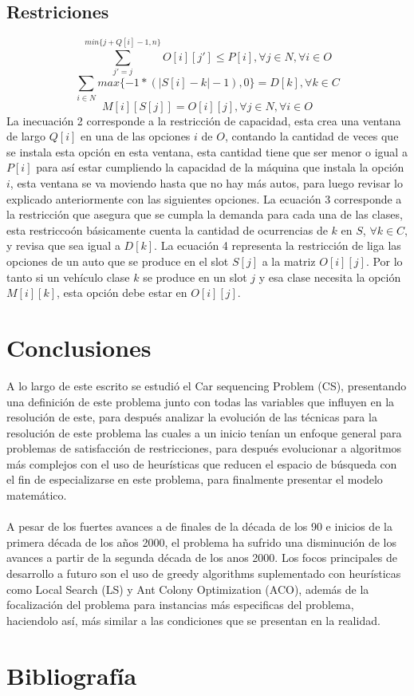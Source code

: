 \documentclass[letter, 10pt]{article}
\begin{document}
\subsection{Restriciones}
\begin{equation}
     \sum_{j'=j}^{min\{j+Q[i]-1,n\}} O[i][j'] \leq P[i],\forall j \in N,\forall i \in O
\end{equation}
\begin{equation}
     \sum_{i \in N} max\{-1*(|S[i] - k| - 1), 0\} = D[k],\forall k \in C
\end{equation}
\begin{equation}
    M[i][S[j]] = O[i][j], \forall j \in N, \forall i \in O
\end{equation}\newline
La inecuaci\'on 2 corresponde a la restricci\'on de capacidad, esta crea una ventana de largo $Q[i]$ en una de las opciones $i$ de $O   $, contando la cantidad de veces que se instala esta opci\'on en esta ventana, esta cantidad tiene que ser menor o igual a $P[i]$ para as\'i estar cumpliendo la capacidad de la m\'aquina que instala la opci\'on $i$, esta ventana se va moviendo hasta que no hay m\'as autos, para luego revisar lo explicado anteriormente con las siguientes opciones. La ecuaci\'on 3 corresponde a la restricci\'on que asegura que se cumpla la demanda para cada una de las clases, esta restricco\'on b\'asicamente cuenta la cantidad de ocurrencias de $k$ en $S$, $\forall k \in C$, y revisa que sea igual a $D[k]$. La ecuaci\'on 4 representa la restricci\'on de liga las opciones de un auto que se produce en el slot $S[j]$ a la matriz $O[i][j]$. Por lo tanto si un veh\'iculo clase $k$ se produce en un slot $j$ y esa clase necesita la opci\'on $M[i][k]$, esta opci\'on debe estar en $O[i][j]$.
\section{Conclusiones}
A lo largo de este escrito se estudi\'o el Car sequencing Problem (CS), presentando una definici\'on de este problema junto con todas las variables que influyen en la resoluci\'on de este, para despu\'es analizar la evoluci\'on de las t\'ecnicas para la resoluci\'on de este problema las cuales a un inicio ten\'ian un enfoque general para problemas de satisfacci\'on de restricciones, para despu\'es evolucionar a algoritmos m\'as complejos con el uso de heur\'isticas que reducen el espacio de b\'usqueda con el fin de especializarse en este problema, para finalmente presentar el modelo matem\'atico.\\\\
A pesar de los fuertes avances a de finales de la d\'ecada de los 90 e inicios de la primera d\'ecada de los a\~{n}os 2000, el problema ha sufrido una disminuci\'on de los avances a partir de la segunda d\'ecada de los anos 2000. Los focos principales de desarrollo a futuro son el uso de greedy algorithms suplementado con heur\'isticas como Local Search (LS) y Ant Colony Optimization (ACO), adem\'as de la focalizaci\'on del problema para instancias m\'as especificas del problema, haciendolo as\'i, m\'as similar a las condiciones que se presentan en la realidad. 
\section{Bibliograf\'ia}



\end{document}
